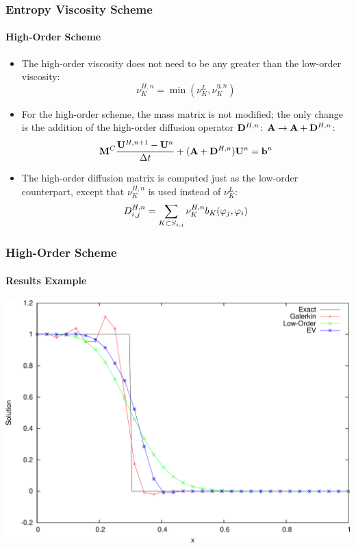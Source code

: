 \documentclass{beamer}
\begin{document}
\begin{frame}
\frametitle{Entropy Viscosity Scheme}
\framesubtitle{High-Order Scheme}

\begin{itemize}
   \item The high-order viscosity does not need to be any greater than the
      low-order viscosity:
      \begin{equation}
         \nu^{H,n}_K = \min(\nu^{L}_K,\nu^{\eta,n}_K)
      \end{equation}
   \item For the high-order scheme, the mass matrix is not modified; the
      only change is the addition of the high-order diffusion operator
      $\diffusionmatrix^{H,n}$:
      $\ssmatrix \rightarrow \ssmatrix + \diffusionmatrix^{H,n}$:
      \begin{equation}
        \consistentmassmatrix\frac{\solutionvector^{H,n+1}
          -\solutionvector^n}{\dt} + (\ssmatrix + \diffusionmatrix^{H,n})
          \solutionvector^n = \ssrhs^n
      \end{equation}
   \item The high-order diffusion matrix is computed just as the low-order
      counterpart, except that $\nu^{H,n}_K$ is used instead of $\nu^{L}_K$:
      \begin{equation}
         D_{i,j}^{H,n} = \sum\limits_{K\subset S_{i,j}}\nu_K^{H,n}
            b_K(\varphi_j,\varphi_i)
      \end{equation}
\end{itemize}

\end{frame}
\begin{frame}
\frametitle{High-Order Scheme}
\framesubtitle{Results Example}

\includegraphics[width=\textwidth]{./figures/advection_high_order.pdf}

\end{frame}
\end{document}
